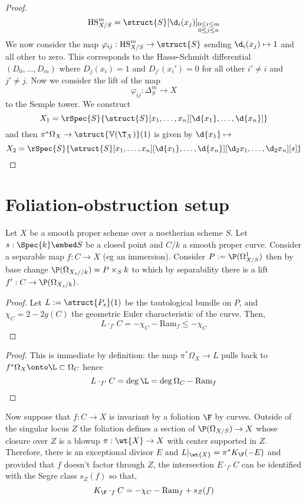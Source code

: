 \documentclass[12pt]{article}
\newcommand{\V}{\mathbb{V}}
\begin{document}
\begin{proof}
\[ \HS_{X/S}^m = \struct{S}[\d_i(x_j)]_{\substack{0 \le i \le m \\ 0 \le j \le n}} \]
We now consider the map $\varphi_{ij} : \HS^m_{X/S} \to \struct{S}$ sending $\d_i(x_j) \mapsto 1$ and all other to zero. This corresponds to the Hasse-Schmidt differential $(D_0, \dots, D_m)$ where $D_j(x_i) = 1$ and $D_{j'}(x_i') = 0$ for all other $i' \neq i$ and $j' \neq j$. Now we consider the lift of the map
\[ \varphi_{ij} : \Delta^m_{S} \to X \]
to the Semple tower. We construct
\[ X_1 = \rSpec{S}{\struct{S}[x_1, \dots, x_n][\d{x_1}, \dots, \d{x_n}]} \]
and then $\pi^* \Omega_X \to \struct{\V(\T_X)}(1)$ is given by $\d{x_1} \mapsto$ 
\[ X_2 = \rSpec{S}{\struct{S}[x_1, \dots, x_n][\d{x_1}, \dots, \d{x_n}][\d_2{x_1}, \dots, \d_2{x_n}][s]} \]
\end{proof}


\section{Foliation-obstruction setup}

\newcommand{\Ram}{\mathrm{Ram}}

Let $X$ be a smooth proper scheme over a noetherian scheme $S$. Let $s : \Spec{k} \embed S$ be a closed point and $C / k$ a smooth proper curve. Consider a separable map $f : C \to X$ (eg an immersion). Consider $P := \P(\Omega_{X/S}^1)$ then by base change $\P(\Omega_{X_s//k}) = P \times_S k$ to which by separability there is a lift $f' : C \to \P(\Omega_{X_s/k})$.

\begin{proof}
Let $L := \struct{P_s}(1)$ be the tautological bundle on $P$, and $\chi_C = 2 - 2 g(C)$ the geometric Euler characteristic of the curve. Then,
\[ L \cdot_{f'} C = - \chi_C - \Ram_f \le - \chi_C \]
\end{proof}

\begin{proof}
This is immediate by definition: the map $\pi^* \Omega_X \to L$ pulls back to $f^* \Omega_X \onto \L \subset \Omega_C$ hence 
\[ L \cdot_{f'} C = \deg{\L} = \deg{\Omega_C} - \Ram_f \] 
\end{proof}

Now suppose that $f : C \to X$ is invariant by a foliation $\F$ by curves. Outside of the singular locus $Z$ the foliation defines a section of $\P(\Omega_{X/S}) \to X$ whose closure over $Z$ is a blowup  $\pi : \wt{X} \to X$ with center supported in $Z$. Therefore, there is an exceptional divisor $E$ and $L|_{\wt{X}} = \pi^* K_{\F}(-E)$ and provided that $f$ doesn't factor through $Z$, the intersection $E \cdot_{f'} C$ can be identified with the Segre class $s_Z(f)$ so that,
\[ K_{\F} \cdot_{f} C = - \chi_C - \Ram_f + s_Z(f) \]
\end{document}
